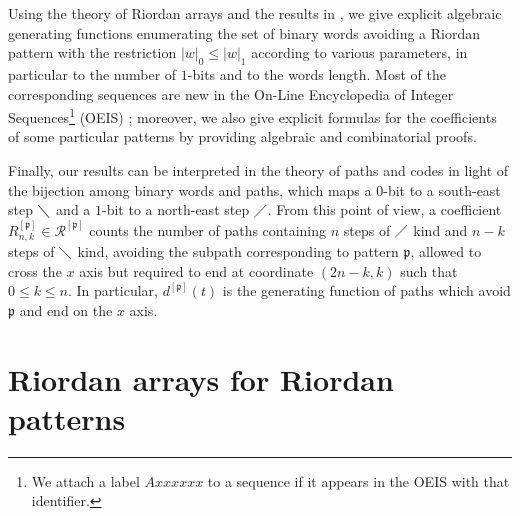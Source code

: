 Using the theory of Riordan arrays and the results in \cite{MS11}, we give
explicit algebraic generating functions enumerating the set of binary words
avoiding a Riordan pattern with the restriction $|w|_0\leq |w|_1$ according to
various parameters, in particular to the number of $1$-bits  and to the words length.
Most of the corresponding sequences are new in the On-Line Encyclopedia of
Integer Sequences\footnote{We attach a label $Axxxxxx$ to a
sequence if it appears in the OEIS with that identifier.} (OEIS) \cite{OEIS};
moreover, we also give explicit formulas for the coefficients of some
particular patterns by providing algebraic and combinatorial proofs.

Finally, our results can be interpreted in the theory of paths and codes in
light of the bijection among binary words and paths, which maps a $0$-bit to a
south-east step $\diagdown$ and a $1$-bit  to a north-east step $\diagup$. From
this point of view, a coefficient $R_{n,k}^{[\mathfrak{p}]} \in
\mathcal{R}^{[\mathfrak{p}]}$ counts the number of paths containing $n$ steps
of $\diagup$ kind and $n-k$ steps of $\diagdown$ kind, avoiding the subpath
corresponding to pattern $\mathfrak{p}$, allowed to cross the $x$ axis but
required to end at coordinate $(2n-k, k)$ such that $0 \leq k \leq n$.
In particular, $d^{[\mathfrak{p}]}(t)$ is the generating function of paths which avoid
 $\mathfrak{p}$ and end on the $x$ axis.


\section{Riordan arrays for Riordan patterns}

